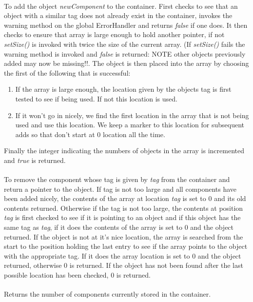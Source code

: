\\
To add the object {\em newComponent} to the container. First checks to
see that an object with a similar tag does not already exist in the
container, invokes the warning method on the global ErrorHandler and
returns {\em false} if one does. It then checks to ensure that array
is large enough to hold another pointer, if not {\em setSize()} is
invoked with twice the size of the current array. (If {\em setSize()}
fails the warning method is invoked and {\em false} is returned: NOTE
other objects previously added may now be missing!!. The object is
then placed into the array by choosing the first of the following that
is successful: \begin{enumerate} 
\item If the array is large enough, the location given by the objects
tag is first tested to see if being used. If not this location is
used.
\item If it won't go in nicely, we find the first location in the
array that is not being used and use this location. We keep a marker
to this location for subsequent adds so that don't start at $0$
location all the time.
\end{enumerate}
\noindent Finally the integer indicating the numbers of objects in the array is
incremented and {\em true} is returned. \\

 
\\
To remove the component whose tag is given by {\em tag} from the
container and return a pointer to the object. If tag is not too large
and all components have been added nicely, the contents of the array
at location {\em tag} is set to $0$ and its old contents
returned. Otherwise if the tag is not too large, the contents at
position {\em tag} is first checked to see if it is pointing to an
object and if this object has the same tag as {\em tag}, if it does
the contents of the array is set to $0$ and the object returned. If
the object is not at it's nice location, the array is searched from
the start to the position holding the last entry to see if the array
points to the object with the appropriate tag. If it 
does the array location is set to $0$ and the object returned,
otherwise $0$ is returned. If the object has not been found after the
last possible location has been checked, $0$ is returned. \\

\\
Returns the number of components currently stored in the container. \\

